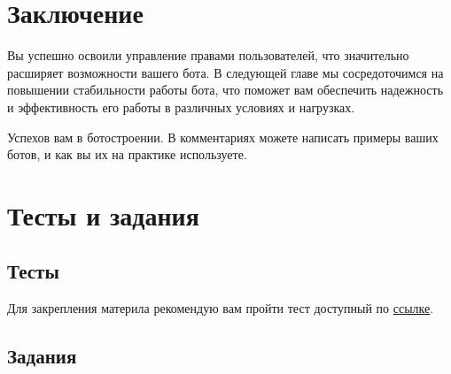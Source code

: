 \documentclass[
]{book}
\newenvironment{Shaded}{\begin{snugshade}}{\end{snugshade}}
\newcommand{\CommentTok}[1]{\textcolor[rgb]{0.56,0.35,0.01}{\textit{#1}}}
\newcommand{\FunctionTok}[1]{\textcolor[rgb]{0.13,0.29,0.53}{\textbf{#1}}}
\newcommand{\NormalTok}[1]{#1}
\newcommand{\OtherTok}[1]{\textcolor[rgb]{0.56,0.35,0.01}{#1}}
\newcommand{\SpecialCharTok}[1]{\textcolor[rgb]{0.81,0.36,0.00}{\textbf{#1}}}
\newcommand{\StringTok}[1]{\textcolor[rgb]{0.31,0.60,0.02}{#1}}
\begin{document}
\begin{Shaded}
\end{Shaded}

\section{Заключение}\label{ux437ux430ux43aux43bux44eux447ux435ux43dux438ux435-4}

Вы успешно освоили управление правами пользователей, что значительно расширяет возможности вашего бота. В следующей главе мы сосредоточимся на повышении стабильности работы бота, что поможет вам обеспечить надежность и эффективность его работы в различных условиях и нагрузках.

Успехов вам в ботостроении. В комментариях можете написать примеры ваших ботов, и как вы их на практике используете.

\section{Тесты и задания}\label{ux442ux435ux441ux442ux44b-ux438-ux437ux430ux434ux430ux43dux438ux44f-4}

\subsection{Тесты}\label{ux442ux435ux441ux442ux44b-4}

Для закрепления материла рекомендую вам пройти тест доступный по \href{https://onlinetestpad.com/t/build-tg-bot-in-r-5}{ссылке}.

\subsection{Задания}\label{ux437ux430ux434ux430ux43dux438ux44f-4}
\end{document}
